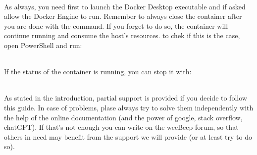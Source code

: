 \\

As always, you need first to launch the Docker Desktop executable and if asked allow the Docker Engine to run.
Remember to always close the container after you are done with the  command. If you forget to do so, the container will continue running and consume the host's resources. to chek if this is the case, open PowerShell and run:

\\

If the status of the container is running, you can stop it with:

\\ 

As stated in the introduction, partial support is provided if you decide to follow this guide. In case of problems, plase always try to solve them independently with the help of the online documentation (and the power of google, stack overflow, chatGPT). If that's not enough you can write on the weeBeep forum, so that others in need may benefit from the support we will provide (or at least try to do so).




